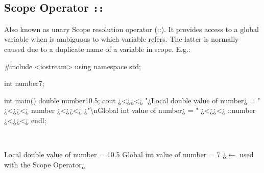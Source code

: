 \subsection{Scope Operator \texttt{::}}
\label{subsec:Useufull-keyword-remarks-02-Unary-Operator}
Also known as unary Scope resolution operator (::). It provides access to a global variable when is ambiguous to which variable refers. The latter is normally caused due to a duplicate name of a variable in scope. E.g.:\\
\begin{minipage}{\MPWxLARGExLISTING\textwidth} %
{} %
\begin{CPPCode}
#include <iostream>
using namespace std;

int number{7};

int main()
{
    double number{10.5};
    cout ¿<¿¿<¿ "¿Local double value of number¿ = " ¿<¿¿<¿ number
           ¿<¿¿<¿ ¿"\textbackslash{}nGlobal int value of number¿ = " ¿<¿¿<¿ ::number ¿<¿¿<¿ endl;
}
\end{CPPCode}
\end{minipage}\\
\begin{minipage}{\MPWxLARGExLISTING\textwidth} %
{} %
\vspace{-0.3cm}
\begin{Terminal}
Local double value of number = 10.5
Global int value of number = 7 ¿\hspace{2cm}$\leftarrow$ used with the Scope Operator¿
\end{Terminal}
\end{minipage}

